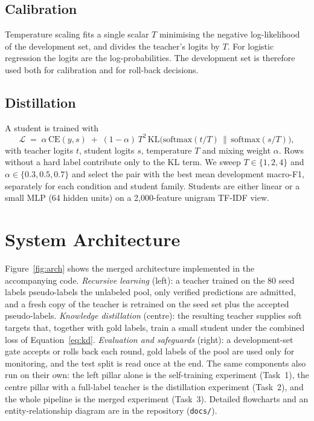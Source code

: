\documentclass[11pt]{article}
\begin{document}
\subsection{Calibration}
Temperature scaling fits a single scalar $T$ minimising the negative log-likelihood of the development set, and divides the teacher's logits by $T$. For logistic regression the logits are the log-probabilities. The development set is therefore used both for calibration and for roll-back decisions.

\subsection{Distillation}
A student is trained with
\begin{equation}
\mathcal{L} \;=\; \alpha\,\mathrm{CE}(y,s) \;+\; (1-\alpha)\,T^{2}\,\mathrm{KL}\!\big(\mathrm{softmax}(t/T)\,\big\|\,\mathrm{softmax}(s/T)\big),
\label{eq:kd}
\end{equation}
with teacher logits $t$, student logits $s$, temperature $T$ and mixing weight $\alpha$. Rows without a hard label contribute only to the KL term. We sweep $T\in\{1,2,4\}$ and $\alpha\in\{0.3,0.5,0.7\}$ and select the pair with the best mean development macro-F1, separately for each condition and student family. Students are either linear or a small MLP (64 hidden units) on a 2{,}000-feature unigram TF-IDF view.

\section{System Architecture}
Figure~\ref{fig:arch} shows the merged architecture implemented in the accompanying code. \emph{Recursive learning} (left): a teacher trained on the 80 seed labels pseudo-labels the unlabeled pool, only verified predictions are admitted, and a fresh copy of the teacher is retrained on the seed set plus the accepted pseudo-labels. \emph{Knowledge distillation} (centre): the resulting teacher supplies soft targets that, together with gold labels, train a small student under the combined loss of Equation~\eqref{eq:kd}. \emph{Evaluation and safeguards} (right): a development-set gate accepts or rolls back each round, gold labels of the pool are used only for monitoring, and the test split is read once at the end. The same components also run on their own: the left pillar alone is the self-training experiment (Task~1), the centre pillar with a full-label teacher is the distillation experiment (Task~2), and the whole pipeline is the merged experiment (Task~3). Detailed flowcharts and an entity-relationship diagram are in the repository (\texttt{docs/}).
\end{document}
